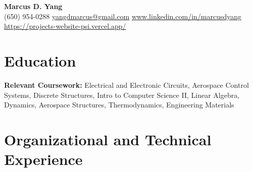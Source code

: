 \newcommand{\entrygap}{\vspace{2pt}}



\begin{center}
  {\fontsize{17}{20}\selectfont\bfseries Marcus D. Yang}\\[2pt]
  {\footnotesize (650) 954-0288 \textbar{} \href{mailto:yangdmarcus@gmail.com}{yangdmarcus@gmail.com} \textbar{} \href{https://www.linkedin.com/in/marcusdyang}{www.linkedin.com/in/marcusdyang} \textbar{} \href{https://projects-website-psi.vercel.app/}{https://projects-website-psi.vercel.app/}}
\end{center}

\section{Education}
\textbf{Relevant Coursework:} Electrical and Electronic Circuits, Aerospace Control Systems, Discrete Structures, Intro to Computer Science II, Linear Algebra, Dynamics, Aerospace Structures, Thermodynamics, Engineering Materials

\section{Organizational and Technical Experience}

